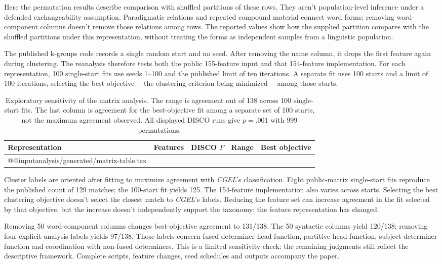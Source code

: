 \documentclass[12pt]{article}
\makeatletter
\newcommand{\tablebody}[1]{\csname @@input\endcsname #1 }
\makeatother
\begin{document}
Here the permutation results describe comparison with shuffled partitions of these rows. They aren't population-level inference under a defended exchangeability assumption. Paradigmatic relations and repeated compound material connect word forms; removing word-component columns doesn't remove those relations among rows. The reported values show how the supplied partition compares with the shuffled partitions under this representation, without treating the forms as independent samples from a linguistic population.

The published k-groups code records a single random start and no seed. After removing the name column, it drops the first feature again during clustering. The reanalysis therefore tests both the public 155-feature input and that 154-feature implementation. For each representation, 100 single-start fits use seeds 1--100 and the published limit of ten iterations. A separate fit uses 100 starts and a limit of 100 iterations, selecting the best objective~-- the clustering criterion being minimized~-- among those starts.

\begin{table}[htbp]
\centering\small
\caption{Exploratory sensitivity of the matrix analysis. The range is agreement out of 138 across 100 single-start fits. The last column is agreement for the best-objective fit among a separate set of 100 starts, not the maximum agreement observed. All displayed DISCO runs give \mbox{$p=.001$} with 999 permutations.}\label{tab:matrix}
\begin{tabular}{>{\raggedright\arraybackslash}p{5.1cm}rrrr}
\toprule
Representation & Features & DISCO $F$ & Range & Best objective \\
\midrule
\tablebody{analysis/generated/matrix-table.tex}
\bottomrule
\end{tabular}
\end{table}

Cluster labels are oriented after fitting to maximize agreement with \textit{CGEL}'s classification. Eight public-matrix single-start fits reproduce the published count of 129 matches; the 100-start fit yields 125. The 154-feature implementation also varies across starts. Selecting the best clustering objective doesn't select the closest match to \textit{CGEL}'s labels. Reducing the feature set can increase agreement in the fit selected by that objective, but the increase doesn't independently support the taxonomy: the feature representation has changed.

Removing 50 word-component columns changes best-objective agreement to 131/138. The 50 syntactic columns yield 120/138; removing four explicit analysis labels yields 97/138. Those labels concern fused determiner-head function, partitive head function, subject-determiner function and coordination with non-fused determiners. This is a limited sensitivity check: the remaining judgments still reflect the descriptive framework. Complete scripts, feature changes, seed schedules and outputs accompany the paper.

\clearpage
\printbibliography
\end{document}
